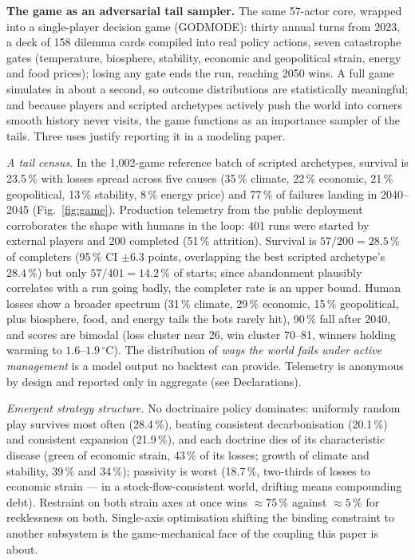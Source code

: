 \documentclass[a4paper,fleqn]{cas-sc}
\begin{document}
\textbf{The game as an adversarial tail sampler.} The same 57-actor core, wrapped into a
single-player decision game (GODMODE): thirty annual turns from 2023, a deck of 158 dilemma
cards compiled into real policy actions, seven catastrophe gates (temperature, biosphere,
stability, economic and geopolitical strain, energy and food prices); losing any gate ends the
run, reaching 2050 wins. A full game simulates in about a second, so outcome distributions are
statistically meaningful; and because players and scripted archetypes actively push the world
into corners smooth history never visits, the game functions as an importance sampler of the
tails. Three uses justify reporting it in a modeling paper.

\emph{A tail census.} In the 1,002-game reference batch of scripted archetypes, survival is
23.5\,\% with losses spread across five causes (35\,\% climate, 22\,\% economic, 21\,\%
geopolitical, 13\,\% stability, 8\,\% energy price) and 77\,\% of failures landing in
2040--2045 (Fig.~\ref{fig:game}). Production telemetry from the public deployment corroborates
the shape with humans in the loop: 401 runs were started by external players and 200 completed
(51\,\% attrition). Survival is $57/200 = 28.5\,\%$ of completers (95\,\% CI ${\pm}6.3$ points,
overlapping the best scripted archetype's $28.4\,\%$) but only $57/401 = 14.2\,\%$ of starts;
since abandonment plausibly correlates with a run going badly, the completer rate is an upper
bound. Human losses show a broader spectrum (31\,\% climate, 29\,\% economic, 15\,\%
geopolitical, plus biosphere, food, and energy tails the bots rarely hit), 90\,\% fall after
2040, and scores are bimodal (loss cluster near 26, win cluster 70--81, winners holding warming
to $1.6$--$1.9\,^{\circ}$C). The distribution of \emph{ways the world fails under active
management} is a model output no backtest can provide. Telemetry is anonymous by design and
reported only in aggregate (see Declarations).

\emph{Emergent strategy structure.} No doctrinaire policy dominates: uniformly random play
survives most often (28.4\,\%), beating consistent decarbonisation (20.1\,\%) and consistent
expansion (21.9\,\%), and each doctrine dies of its characteristic disease (green of economic
strain, 43\,\% of its losses; growth of climate and stability, 39\,\% and 34\,\%); passivity is
worst (18.7\,\%, two-thirds of losses to economic strain --- in a stock-flow-consistent world,
drifting means compounding debt). Restraint on both strain axes at once wins ${\approx}75\,\%$
against ${\approx}5\,\%$ for recklessness on both. Single-axis optimisation shifting the
binding constraint to another subsystem is the game-mechanical face of the coupling this paper
is about.
\end{document}
